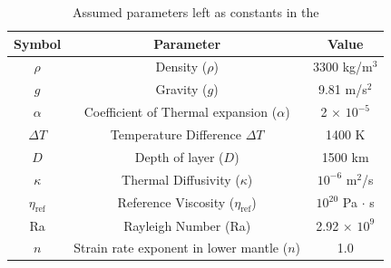 \documentclass[12pt]{article}
\newcommand{\mgnote}[1]{\textcolor{magenta}{MG: #1}}
\begin{document}
{\begin{table}[H]
  \caption{Assumed parameters left as constants in the }
  \centering  %
  \begin{tabular}{c c c} %
    \hline \hline                        %
    Symbol & Parameter & Value  \\ [0.5ex] %
    \hline                  %
    $\rho$ & Density ($\rho$)  & 3300 kg/m$^3$ \\
    $g$ & Gravity ($g$) & 9.81 m/s$^2$ \\
    $\alpha$ & Coefficient of Thermal expansion ($\alpha$) & 2 $\times$ $10^{-5}$ \\ 
    $\Delta T$& Temperature Difference $\Delta T$ & 1400 K \\
    $D$& Depth of layer ($D$) & 1500 km \\
    $\kappa$& Thermal Diffusivity ($\kappa$) & $10^{-6}$  m$^2$/s \\
    $\eta_{\text{ref}}$& Reference Viscosity  ($\eta_{\text{ref}}$) & $10^{20}$ Pa $\cdot$ s \\
    Ra & Rayleigh Number (Ra) & 2.92 $\times$ $10^9$ \\
    $n$ & Strain rate exponent in lower mantle ($n$) & 1.0 \\
    \hline %
  \end{tabular}
  \label{table:parameters} %
\end{table}



}
\end{document}
